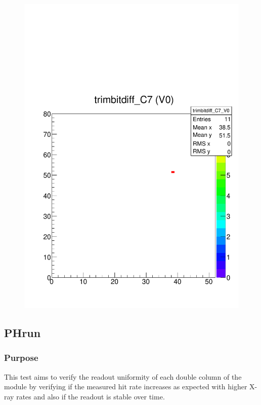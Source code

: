 \documentclass[a4paper,12pt,twoside]{article}
\begin{document}
\begin{figure}
\begin{minipage}{.48\textwidth}
  \centering
  \includegraphics[width=\textwidth]{./RetrimHotPixels_TrimBitDiff.pdf}
  \label{RetrimHotPixels-TrimbitHitmap}
\end{minipage}
\end{figure}

\subsection{PHrun}
\subsubsection{Purpose}
This test aims to verify the readout uniformity of each double column of the module by verifying if the measured hit rate increases as expected with higher X-ray rates and also if the readout is stable over time.
\end{document}
